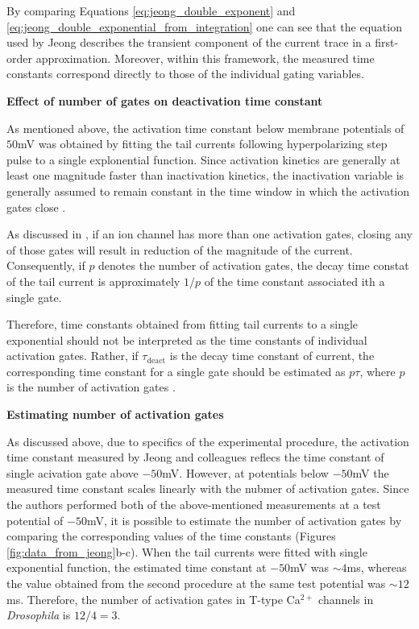 \documentclass[../main.tex]{subfiles}
\begin{document}
By comparing Equations \ref{eq:jeong_double_exponent} and \ref{eq:jeong_double_exponential_from_integration} one can see that the equation used by Jeong describes the transient component of the current trace in a first-order approximation. Moreover, within this framework, the measured time constants correspond directly to those of the individual gating variables.


\vspace*{0.3cm}
\noindent\textbf{Effect of number of gates on deactivation time constant}

As mentioned above, the activation time constant below membrane potentials of $50$mV was obtained by fitting the tail currents following hyperpolarizing step pulse to a single explonential function. Since activation kinetics are generally at least one magnitude faster than inactivation kinetics, the inactivation variable is generally assumed to remain constant in the time window in which the activation gates close \parencite{izhikevichDynamicalSystemsNeuroscience2006}.

As discussed in \parencite{huguenardSimulationCurrentsInvolved1992}, if an ion channel has more than one activation gates, closing any of those gates will result in reduction of the magnitude of the current. Consequently, if $p$ denotes the number of activation gates, the decay time constat of the tail current is approximately $1/p$ of the time constant associated ith a single gate. 

Therefore, time constants obtained from fitting tail currents to a single exponential should not be interpreted as the time constants of individual activation gates. Rather, if $\tau_{\text{deact}}$ is the decay time constant of current, the corresponding time constant for a single gate should be estimated as $p\tau$, where $p$ is the number of activation gates \parencite{huguenardSimulationCurrentsInvolved1992}.

\vspace*{0.3cm}
\noindent\textbf{Estimating number of activation gates}

As discussed above, due to specifics of the experimental procedure, the activation time constant measured by Jeong and colleagues reflecs the time constant of single acivation gate above $-50$mV. However, at potentials below $-50$mV the measured time constant scales linearly with the nubmer of activation gates. Since the authors performed both of the above-mentioned measurements at a test potential of $-50$mV, 
it is possible to estimate the number of activation gates by comparing the corresponding values of the time constants (Figures \ref{fig:data_from_jeong}b-c). When the tail currents were fitted with single exponential function, the estimated time constant at $-50$mV was $\sim 4$ms, whereas the value obtained from the second procedure at the same test potential was $\sim12$ms. Therefore, the number of activation gates in T-type Ca$^{2+}$ channels in \textit{Drosophila} is $12/4=3$.
\end{document}
